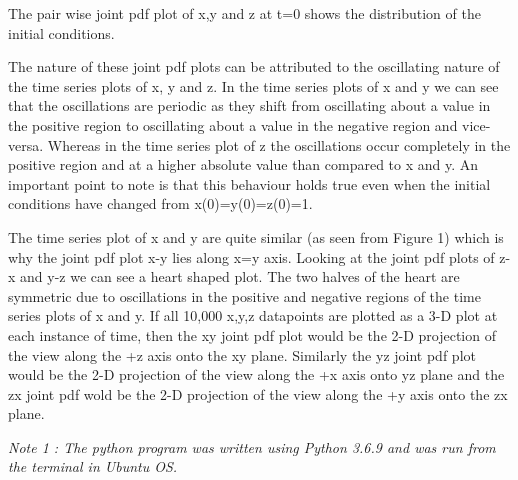 \documentclass{article}
\begin{document}
\vspace{-0.5cm}

The pair wise joint pdf plot of x,y and z at t=0 shows the distribution of the initial conditions.

The nature of these joint pdf plots can be attributed to the oscillating nature of the time series plots of x, y and z. In the time series plots of x and y we can see that the oscillations are periodic as they shift from oscillating about a value in the positive region to oscillating about a value in the negative region and vice-versa. Whereas in the time series plot of z the oscillations occur completely in the positive region and at a higher absolute value than compared to x and y. An important point to note is that this behaviour holds true even when the initial conditions have changed from x(0)=y(0)=z(0)=1. 

The time series plot of x and y are quite similar (as seen from Figure 1) which is why the joint pdf plot x-y lies along x=y axis. Looking at the joint pdf plots of z-x and y-z we can see a heart shaped plot. The two halves of the heart are symmetric due to oscillations in the positive and negative regions of the time series plots of x and y. If all 10,000 x,y,z datapoints are plotted as a 3-D plot at each instance of time, then the xy joint pdf plot would be the 2-D projection of the view along the +z axis onto the xy plane. Similarly the yz joint pdf plot would be the 2-D projection of the view along the +x axis onto yz plane and the zx joint pdf wold be the 2-D projection of the view along the +y axis onto the zx plane.

\emph{Note 1 : The python program was written using Python 3.6.9 and was run from the terminal in Ubuntu OS.}
\end{document}
